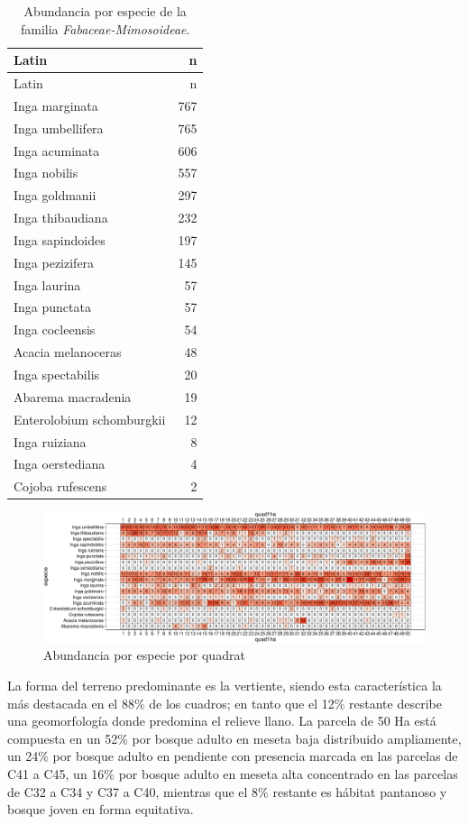 \documentclass[11pt,]{article}
\begin{document}
\begin{longtable}[]{@{}lr@{}}
\caption{\label{tab:abun_sp}Abundancia por especie de la familia
\emph{Fabaceae-Mimosoideae}.}\tabularnewline
\toprule
Latin & n\tabularnewline
\midrule
\endfirsthead
\toprule
Latin & n\tabularnewline
\midrule
\endhead
Inga marginata & 767\tabularnewline
Inga umbellifera & 765\tabularnewline
Inga acuminata & 606\tabularnewline
Inga nobilis & 557\tabularnewline
Inga goldmanii & 297\tabularnewline
Inga thibaudiana & 232\tabularnewline
Inga sapindoides & 197\tabularnewline
Inga pezizifera & 145\tabularnewline
Inga laurina & 57\tabularnewline
Inga punctata & 57\tabularnewline
Inga cocleensis & 54\tabularnewline
Acacia melanoceras & 48\tabularnewline
Inga spectabilis & 20\tabularnewline
Abarema macradenia & 19\tabularnewline
Enterolobium schomburgkii & 12\tabularnewline
Inga ruiziana & 8\tabularnewline
Inga oerstediana & 4\tabularnewline
Cojoba rufescens & 2\tabularnewline
\bottomrule
\end{longtable}

\begin{figure}
\centering
\includegraphics{manuscrito_files/figure-latex/unnamed-chunk-3-1.pdf}
\caption{\label{fig:abun_sp_q}Abundancia por especie por quadrat}
\end{figure}

La forma del terreno predominante es la vertiente, siendo esta
característica la más destacada en el 88\% de los cuadros; en tanto que
el 12\% restante describe una geomorfología donde predomina el relieve
llano. La parcela de 50 Ha está compuesta en un 52\% por bosque adulto
en meseta baja distribuido ampliamente, un 24\% por bosque adulto en
pendiente con presencia marcada en las parcelas de C41 a C45, un 16\%
por bosque adulto en meseta alta concentrado en las parcelas de C32 a
C34 y C37 a C40, mientras que el 8\% restante es hábitat pantanoso y
bosque joven en forma equitativa.
\end{document}
